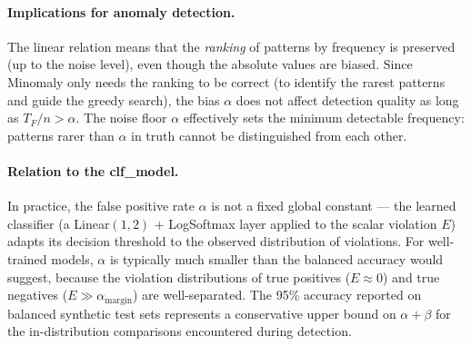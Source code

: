 \documentclass[11pt,a4paper]{article}
\theoremstyle{plain}
\theoremstyle{definition}
\begin{document}
\paragraph{Implications for anomaly detection.}
The linear relation means that the \emph{ranking} of patterns by frequency is preserved (up to the noise level), even though the absolute values are biased. Since Minomaly only needs the ranking to be correct (to identify the rarest patterns and guide the greedy search), the bias $\alpha$ does not affect detection quality as long as $T_F/n > \alpha$. The noise floor $\alpha$ effectively sets the minimum detectable frequency: patterns rarer than $\alpha$ in truth cannot be distinguished from each other.

\paragraph{Relation to the clf\_model.}
In practice, the false positive rate $\alpha$ is not a fixed global constant --- the learned classifier (a Linear$(1, 2)$ + LogSoftmax layer applied to the scalar violation $E$) adapts its decision threshold to the observed distribution of violations. For well-trained models, $\alpha$ is typically much smaller than the balanced accuracy would suggest, because the violation distributions of true positives ($E \approx 0$) and true negatives ($E \gg \alpha_{\text{margin}}$) are well-separated. The 95\% accuracy reported on balanced synthetic test sets represents a conservative upper bound on $\alpha + \beta$ for the in-distribution comparisons encountered during detection.
\end{document}
